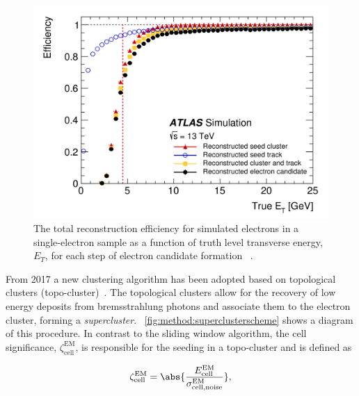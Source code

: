 \begin{figure}[]
    \centering
    \includegraphics[width=\mediumfigwidth]{images/2015_2016_recoeff.png}
    \caption[Total reconstruction energy for simulated electrons using the sliding window algorithm]{The total reconstruction efficiency for simulated electrons in a single-electron sample as a function of truth level transverse energy, $E_T$, for each step of electron candidate formation ~\cite{slidingwindowreco}.}
    \label{fig:method:slidingwindow-reco}
\end{figure}

From 2017 a new clustering algorithm has been adopted based on topological clusters (topo-cluster)~\cite{Aad:2019tso}. The topological clusters allow for the recovery of low energy deposits from bremsstrahlung photons and associate them to the electron cluster, forming a \emph{supercluster}. ~\cref{fig:method:superclusterscheme} shows a diagram of this procedure. In contrast to the sliding window algorithm, the cell significance, $\zeta^{\mathrm{EM}}_{\mathrm{cell}}$, is responsible for the seeding in a topo-cluster and is defined as

\begin{equation}
    \zeta^{\mathrm{EM}}_{\mathrm{cell}} = \abs{\frac{E^{\mathrm{EM}}_{\mathrm{cell}}}{\sigma^{\mathrm{EM}}_{\mathrm{cell,noise}}}},
\end{equation}

